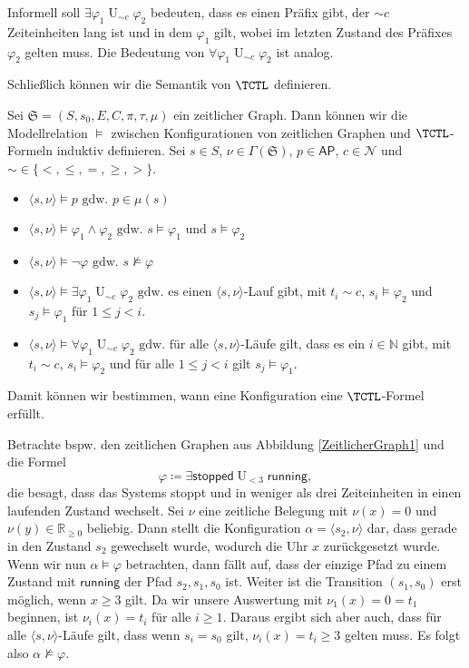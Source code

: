 Informell soll $\exists\varphi_1 \operatorname{U}_{\sim c}\varphi_2$ bedeuten, dass es einen Präfix gibt, der $\sim c$ Zeiteinheiten lang ist und in dem $\varphi_1$ gilt, wobei im letzten Zustand des Präfixes $\varphi_2$ gelten muss.
Die Bedeutung von $\forall\varphi_1 \operatorname{U}_{\sim c}\varphi_2$ ist analog.

Schließlich können wir die Semantik von $\TCTL$ definieren.
\begin{definition}
	Sei $\mathfrak{S}=(S,s_0,E,C,\pi,\tau,\mu)$ ein zeitlicher Graph.
	Dann können wir die Modellrelation $\models$ zwischen Konfigurationen von zeitlichen Graphen und $\TCTL$-Formeln induktiv definieren. Sei $s\in S$, $\nu\in \Gamma(\mathfrak{S})$, $p\in \mathsf{AP}$, $c\in \mathcal{N}$ und $\sim\in \{<,\leq,=,\geq,>\}$. \cite{alur1990model}
	\begin{itemize}
		\item $\langle s,\nu\rangle \models p\text{ gdw. }p\in \mu(s)$
		\item $\langle s,\nu\rangle \models \varphi_1\land \varphi_2\text{ gdw. }s\models \varphi_1\text{ und }s\models \varphi_2$
		\item $\langle s,\nu \rangle \models \neg\varphi\text{ gdw. }s\not\models\varphi$
		\item $\langle s,\nu \rangle \models \exists\varphi_1 \operatorname{U}_{\sim c}\varphi_2\text{ gdw. es einen }\langle s,\nu\rangle$-Lauf gibt, mit $t_i \sim c$, $s_i\models \varphi_2$ und $s_j\models \varphi_1$ für $1\leq j < i$.
		\item $\langle s,\nu \rangle\models \forall\varphi_1 \operatorname{U}_{\sim c}\varphi_2\text{ gdw. für alle }\langle s,\nu\rangle$-Läufe gilt, dass es ein $i\in \mathbb{N}$ gibt, mit $t_i \sim c$, $s_i\models \varphi_2$ und für alle $1\leq j < i$ gilt $s_j\models \varphi_1$.
	\end{itemize}
\end{definition}

Damit können wir bestimmen, wann eine Konfiguration eine $\TCTL$-Formel erfüllt.
\begin{example}
	Betrachte bspw. den zeitlichen Graphen aus Abbildung \ref{ZeitlicherGraph1} und die Formel 
	$$\varphi\coloneqq \exists\mathsf{stopped}\operatorname{U}_{< 3} \mathsf{running},$$ die besagt, dass das Systems stoppt und in weniger als drei Zeiteinheiten in einen laufenden Zustand wechselt.
	Sei $\nu$ eine zeitliche Belegung mit $\nu(x)=0$ und $\nu(y)\in \mathbb{R}_{\geq 0}$ beliebig.
	Dann stellt die Konfiguration $\alpha = \langle s_2,\nu \rangle$ dar, dass gerade in den Zustand $s_2$ gewechselt wurde, wodurch die Uhr $x$ zurückgesetzt wurde.
	Wenn wir nun $\alpha \models \varphi$ betrachten, dann fällt auf, dass der einzige Pfad zu einem Zustand mit $\mathsf{running}$ der Pfad $s_2, s_1,s_0$ ist. 
	Weiter ist die Transition $(s_1,s_0)$ erst möglich, wenn $x\geq 3$ gilt.
	Da wir unsere Auswertung mit $\nu_1(x)=0=t_1$ beginnen, ist $\nu_i(x)=t_i$ für alle $i\geq 1$.
	Daraus ergibt sich aber auch, dass für alle $\langle s,\nu \rangle$-Läufe gilt, dass wenn $s_i = s_0$ gilt, $\nu_i(x)=t_i \geq 3$ gelten muss.
	Es folgt also $\alpha \not\models \varphi$.
\end{example}

